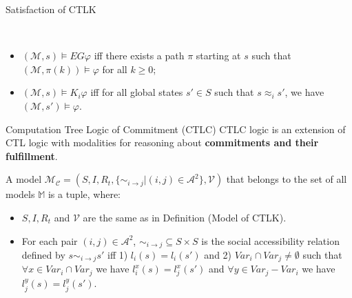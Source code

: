 \documentclass{beamer}
\begin{document}
\begin{frame}{Satisfaction of CTLK}
\begin{definition} ~\\
\begin{itemize}
\item $ (\mathcal{M}, s ) \models EG \varphi$ iff there exists a path $\pi$  starting at $s$ such that $ (\mathcal{M}, \pi(k) ) \models \varphi$ for all $ k \geq 0$;
\item $ (\mathcal{M}, s ) \models K_i \varphi $ iff for all global states $s' \in S$ such that $s \approx_i s'$, we have $(\mathcal{M}, s' ) \models \varphi $.
\end{itemize}
\label {dfn: Satisfaction of CTLK}
\end{definition}
\end{frame}
\begin{frame}{Computation Tree Logic of Commitment (CTLC)}
CTLC logic is an extension of CTL logic with modalities for reasoning about \textbf{commitments and their fulfillment}.
\begin{definition} \label{Model of CTLC}
A model $\mathcal{M_C}=(S,I,R_t, \{\sim _{i \rightarrow j}|{(i,j)\in \mathcal{A}^2}\},\mathcal{V})$ that belongs to the set of all models $\mathbb{M}$ is a tuple, where:
\begin {itemize}
\item $S, I, R_t$ and $\mathcal{V}$ are the same as in Definition (Model of CTLK).
\item For each pair $(i, j) \in \mathcal{A}^2 $, $\sim _{i \rightarrow j} \subseteq S \times S $ is the social accessibility relation defined by $ s \sim _{i \rightarrow j} s' $ iff
     1) $ l_i(s) = l_i(s') $ and 2) $ Var_i \cap Var_j \neq \emptyset $ such that  $ \forall x \in Var_i \cap Var_j $ we have $ l_i^x(s) = l_j^x(s') $ and $ \forall y \in Var_j - Var_i $ we have $ l_j^y(s) = l_j^y(s')$.

\end {itemize}
\label {dfn: Model of CTLC}
\end{definition}
\end{frame}
\end{document}

